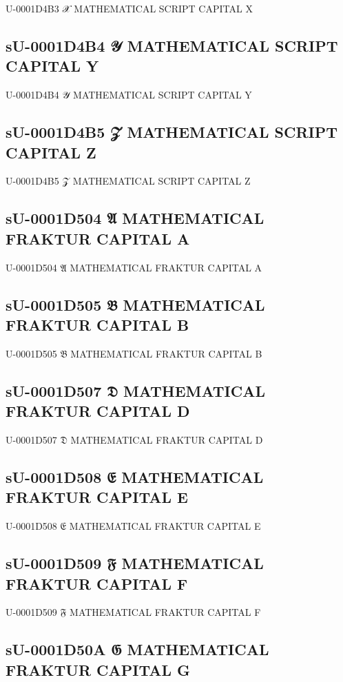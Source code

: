 U-0001D4B3 𝒳 MATHEMATICAL SCRIPT CAPITAL X

\subsection{sU-0001D4B4 𝒴 MATHEMATICAL SCRIPT CAPITAL Y}

U-0001D4B4 𝒴 MATHEMATICAL SCRIPT CAPITAL Y

\subsection{sU-0001D4B5 𝒵 MATHEMATICAL SCRIPT CAPITAL Z}

U-0001D4B5 𝒵 MATHEMATICAL SCRIPT CAPITAL Z

\subsection{sU-0001D504 𝔄 MATHEMATICAL FRAKTUR CAPITAL A}

U-0001D504 𝔄 MATHEMATICAL FRAKTUR CAPITAL A

\subsection{sU-0001D505 𝔅 MATHEMATICAL FRAKTUR CAPITAL B}

U-0001D505 𝔅 MATHEMATICAL FRAKTUR CAPITAL B

\subsection{sU-0001D507 𝔇 MATHEMATICAL FRAKTUR CAPITAL D}

U-0001D507 𝔇 MATHEMATICAL FRAKTUR CAPITAL D

\subsection{sU-0001D508 𝔈 MATHEMATICAL FRAKTUR CAPITAL E}

U-0001D508 𝔈 MATHEMATICAL FRAKTUR CAPITAL E

\subsection{sU-0001D509 𝔉 MATHEMATICAL FRAKTUR CAPITAL F}

U-0001D509 𝔉 MATHEMATICAL FRAKTUR CAPITAL F

\subsection{sU-0001D50A 𝔊 MATHEMATICAL FRAKTUR CAPITAL G}

